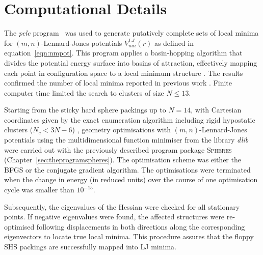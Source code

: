

\section{Computational Details}

The \textit{pele} program~\autocite{_pelePythonenergy_2017} was used to generate
putatively complete sets of local minima for $(m,n)$-Lennard-Jones potentials
$V_{mn}^{\mathrm LJ}(r)$ as defined in equation~\eqref{eqn:nmpot}. This program
applies a basin-hopping algorithm that divides the potential energy surface into
basins of attraction, effectively mapping each point in configuration space to a
local minimum structure
\autocite{Li_MonteCarlominimizationapproach_1987,waless99,Wales_GlobalOptimizationBasinHopping_1997}.
The results confirmed the number of local minima reported in previous work
\autocite{Doye_Saddlepointsdynamics_2002}. Finite computer time limited the
search to clusters of size $N \leq 13$.

Starting from the sticky hard sphere packings up to $N=14$, with Cartesian
coordinates given by the exact enumeration algorithm
\autocite{Hoy_Structurefinitesphere_2012} including rigid hypostatic clusters
($N_c<3N-6$) \autocite{Holmes-Cerfon_EnumeratingRigidSphere_2016}, geometry
optimisations with $(m,n)$-Lennard-Jones potentials using the multidimensional
function minimiser from the \Cpp library \textit{dlib}
\autocite{King_DlibmlMachineLearning_2009} were carried out with the previously
described program package \textsc{Spheres}
(Chapter~\ref{sec:theprogramspheres}). The optimisation scheme was either the
\acf{BFGS} or the conjugate gradient algorithm. The optimisations were terminated
when the change in energy (in reduced units) over the course of one
optimisation cycle was smaller than $10^{-15}$. 

Subsequently, the eigenvalues of the Hessian were checked for all stationary
points. If negative eigenvalues were found, the affected structures were
re-optimised following displacements in both directions along the corresponding
eigenvectors to locate true local minima. This procedure assures that the floppy
\ac{SHS} packings are successfully mapped into \ac{LJ} minima.

